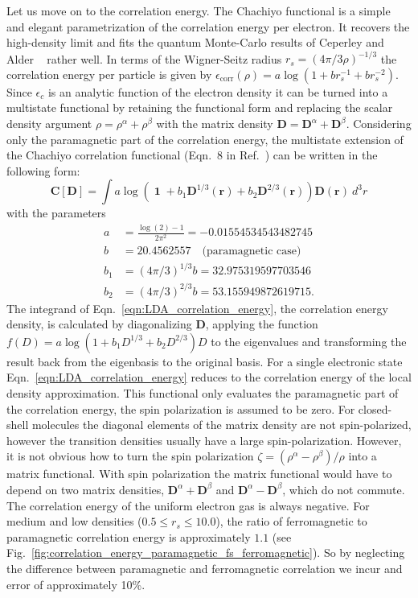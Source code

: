 \documentclass[journal=jacsat,manuscript=article]{achemso}
\DeclareMathOperator{\Id}{\mathbf{1}}
\newcommand\m[1]{\mathbf{#1}}
\renewcommand\vec[1]{\mathbf{#1}}
\begin{document}
Let us move on to the correlation energy.
The Chachiyo functional \cite{Chachiyo2016} is a simple and elegant parametrization of the correlation energy per electron.
It recovers the high-density limit and fits the quantum Monte-Carlo results of Ceperley and Alder ~\cite{Ceperley1980} rather well.
In terms of the Wigner-Seitz radius $r_s=\left(4 \pi /3 \rho\right)^{-1/3}$ the correlation energy per particle is given
by $\epsilon_{\text{corr}}(\rho) = a \log(1 + b r_s^{-1} + b r_s^{-2})$. Since $\epsilon_c$ is an analytic function of the electron density
it can be turned into a multistate functional by retaining the
functional form and replacing the scalar density argument $\rho=\rho^{\alpha}+\rho^{\beta}$
with the matrix density $\m{D}=\m{D}^{\alpha}+\m{D}^{\beta}$. Considering only the paramagnetic part of the correlation energy,
the multistate extension of the Chachiyo correlation functional (Eqn.~8 in Ref.~\cite{Chachiyo2016}) can be written in the following form:
\begin{equation}
 \m{C}[\m{D}] = \int a \log\left( \Id + b_1 \m{D}^{1/3}(\vec{r}) + b_2 \m{D}^{2/3}(\vec{r}) \right) \m{D}(\vec{r}) ~ d^3r
 \label{eqn:LDA_correlation_energy}
\end{equation}
with the parameters
\begin{align}
 a &= \frac{\log(2)-1}{2 \pi^2} = -0.01554534543482745 \\
 b &= 20.4562557 \quad \text{(paramagnetic case)} \\
 b_1 &= \left(4 \pi /3 \right)^{1/3} b = 32.975319597703546 \\
 b_2 &= \left(4 \pi /3 \right)^{2/3} b = 53.155949872619715.
\end{align}
The integrand of Eqn.~\ref{eqn:LDA_correlation_energy}, the correlation energy density,
is calculated by diagonalizing $\m{D}$,
applying the function $f(D) = a \log(1 + b_1 D^{1/3} + b_2 D^{2/3}) D$ to the eigenvalues
and transforming the result back from the eigenbasis to the original basis.
For a single electronic state Eqn.~\ref{eqn:LDA_correlation_energy} reduces to the correlation energy
of the local density approximation.
This functional only evaluates the paramagnetic part of the correlation
energy, the spin polarization is assumed to be zero.
For closed-shell molecules the diagonal elements of the matrix density are not spin-polarized, however
the transition densities usually have a large spin-polarization. However, it is not obvious how to turn the spin
polarization $\zeta = (\rho^{\alpha} - \rho^{\beta})/\rho$ into a matrix functional. With spin polarization the
matrix functional would have to depend on two matrix densities, $\m{D}^{\alpha}+\m{D}^{\beta}$ and $\m{D}^{\alpha}-\m{D}^{\beta}$,
which do not commute.
The correlation energy of the uniform electron gas is always negative. For medium
and low densities ($0.5 \leq r_s \leq 10.0$), the ratio of ferromagnetic to paramagnetic
correlation energy is approximately $1.1$ (see Fig.~\ref{fig:correlation_energy_paramagnetic_fs_ferromagnetic}).
So by neglecting the difference between paramagnetic and ferromagnetic correlation
we incur and error of approximately 10\%.
\end{document}
